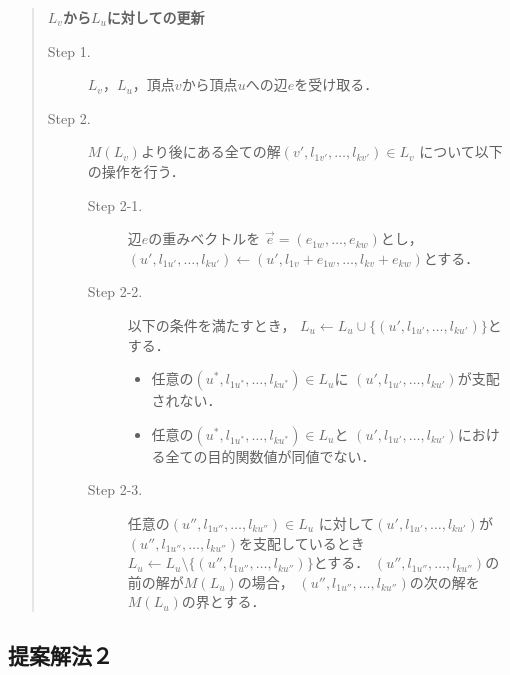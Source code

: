 \documentclass[12pt]{optlab-bachelor}
\begin{document}
\begin{quote}
  \textbf{$L_v$から$L_u$に対しての更新}
  \begin{description}
    \item[Step 1.] $L_v$，$L_u$，頂点$v$から頂点$u$への辺$e$を受け取る．
    \item[Step 2.] $M(L_v)$より後にある全ての解$(v',l_{1v'},\ldots,l_{kv'}) \in L_v$
    について以下の操作を行う．
    \begin{description}
      \item[Step 2-1.] 辺$e$の重みベクトルを
      $\vec{e} = (e_{1w},\ldots,e_{kw})$とし，
      $(u',l_{1u'},\ldots,l_{ku'}) \leftarrow
      (u',l_{1v}+e_{1w},\ldots,l_{kv}+e_{kw})$とする．
      \item[Step 2-2.] 以下の条件を満たすとき，
      $L_u \leftarrow L_u \cup \{(u',l_{1u'},\ldots,l_{ku'})\}$とする．
      \begin{itemize}
        \item 任意の$(u^*,l_{1u^*},\ldots,l_{ku^*})\in L_u$に
        $(u',l_{1u'},\ldots,l_{ku'})$が支配されない．
        \item 任意の$(u^*,l_{1u^*},\ldots,l_{ku^*}) \in L_u$と
        $(u',l_{1u'},\ldots,l_{ku'})$における全ての目的関数値が同値でない．
      \end{itemize}
      \item[Step 2-3.] 任意の$(u'',l_{1u''},\ldots,l_{ku''})\in L_u$
      に対して$(u',l_{1u'},\ldots,l_{ku'})$が
      $(u'',l_{1u''},\ldots,l_{ku''})$を支配しているとき
      $L_u \leftarrow L_u \setminus \{(u'',l_{1u''},\ldots,l_{ku''})\}$とする．
      $(u'',l_{1u''},\ldots,l_{ku''})$の前の解が$M(L_u)$の場合，
      $(u'',l_{1u''},\ldots,l_{ku''})$の次の解を$M(L_u)$の界とする．
    \end{description}
  \end{description}
\end{quote}


\subsection{提案解法２}
\end{document}
